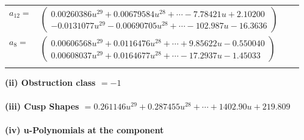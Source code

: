 \documentclass[1p]{elsarticle_modified}
\theoremstyle{definition}
\begin{document}
\begin{tabular}{m{7pt} m{180pt} m{7pt} m{180pt} }
\flushright $a_{12}=$&$\begin{pmatrix}0.00260386 u^{29}+0.00679584 u^{28}+\cdots-7.78421 u+2.10200\\-0.0131077 u^{29}-0.00690705 u^{28}+\cdots-102.987 u-16.3636\end{pmatrix}$ \\
\flushright $a_{8}=$&$\begin{pmatrix}0.00606568 u^{29}+0.0116476 u^{28}+\cdots+9.85622 u-0.550040\\0.00608037 u^{29}+0.0164677 u^{28}+\cdots-17.2937 u-1.45033\end{pmatrix}$\\&\end{tabular}
\flushleft \textbf{(ii) Obstruction class $= -1$}\\~\\
\flushleft \textbf{(iii) Cusp Shapes $= 0.261146 u^{29}+0.287455 u^{28}+\cdots+1402.90 u+219.809$}\\~\\
\newpage\renewcommand{\arraystretch}{1}
\flushleft \textbf{(iv) u-Polynomials at the component}\newline \\
\end{document}
